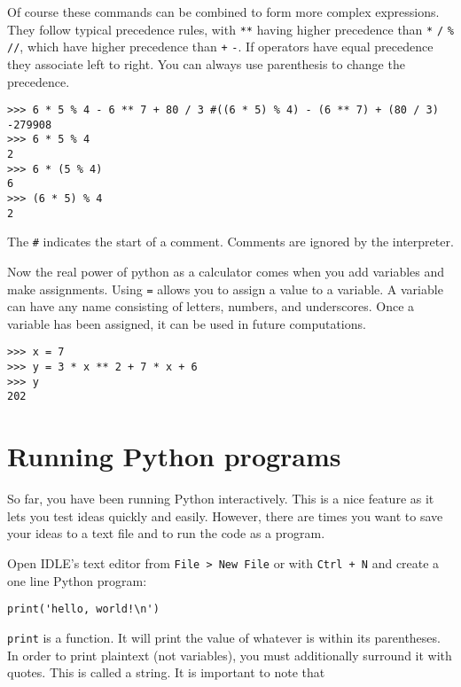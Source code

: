 \documentclass[12pt]{article}
\begin{document}
Of course these commands can be combined to form more complex expressions. They follow typical precedence rules, with \texttt{**} having higher precedence than \texttt{*} \texttt{/} \texttt{\%} \texttt{//}, which have higher precedence than \texttt{+} \texttt{-}. If operators have equal precedence they associate left to right. You can always use parenthesis to change the precedence.

\begin{lstlisting}[style=bash]
>>> 6 * 5 % 4 - 6 ** 7 + 80 / 3 #((6 * 5) % 4) - (6 ** 7) + (80 / 3)
-279908
>>> 6 * 5 % 4
2
>>> 6 * (5 % 4)
6
>>> (6 * 5) % 4
2
\end{lstlisting}

The \texttt{\#} indicates the start of a comment. Comments are ignored by the interpreter.

Now the real power of python as a calculator comes when you add variables and make assignments. Using \texttt{=} allows you to assign a value to a variable. A variable can have any name consisting of letters, numbers, and underscores. Once a variable has been assigned, it can be used in future computations.

\begin{lstlisting}[style=bash]
>>> x = 7
>>> y = 3 * x ** 2 + 7 * x + 6
>>> y
202
\end{lstlisting}


\section{Running Python programs} 

So far, you have been running Python interactively. This is a nice feature as it lets you test ideas quickly and easily. However, there are times you want to save your ideas to a text file and to run the code as a program.

Open IDLE's text editor from \texttt{File > New File} or with \texttt{Ctrl + N} and create a one line Python program:

\begin{lstlisting}[style=c]
print('hello, world!\n')
\end{lstlisting}

\texttt{print} is a function. It will print the value of whatever is within its parentheses. In order to print plaintext (not variables), you must additionally surround it with quotes. This is called a string. It is important to note that
\end{document}
